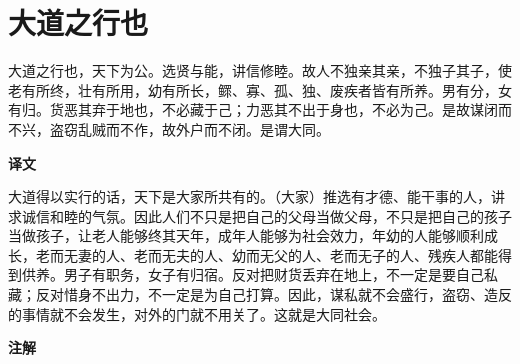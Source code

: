\documentclass[12pt,UTF-8,openany,a4]{ctexbook}
\begin{document}
\chapter{大道之行也}

\begin{large}
    
    大道之行也，天下为公。选贤与能，讲信修睦。故人不独亲其亲，不独子其子，使老有所终，壮有所用，幼有所长，鳏、寡、孤、独、废疾者皆有所养。男有分，女有归。货恶其弃于地也，不必藏于己；力恶其不出于身也，不必为己。是故谋闭而不兴，盗窃乱贼而不作，故外户而不闭。是谓大同。
\end{large}


\newpage

\begin{Large}
    \noindent\textbf{译文}
\end{Large}


\vspace{1em}

\begin{large}
    \yiwen 
    大道得以实行的话，天下是大家所共有的。（大家）推选有才德、能干事的人，讲求诚信和睦的气氛。因此人们不只是把自己的父母当做父母，不只是把自己的孩子当做孩子，让老人能够终其天年，成年人能够为社会效力，年幼的人能够顺利成长，老而无妻的人、老而无夫的人、幼而无父的人、老而无子的人、残疾人都能得到供养。男子有职务，女子有归宿。反对把财货丢弃在地上，不一定是要自己私藏；反对惜身不出力，不一定是为自己打算。因此，谋私就不会盛行，盗窃、造反的事情就不会发生，对外的门就不用关了。这就是大同社会。
    
\end{large}


\newpage

\begin{Large}
    \noindent\textbf{注解}
\end{Large}


\vspace{-1em}
\end{document}
